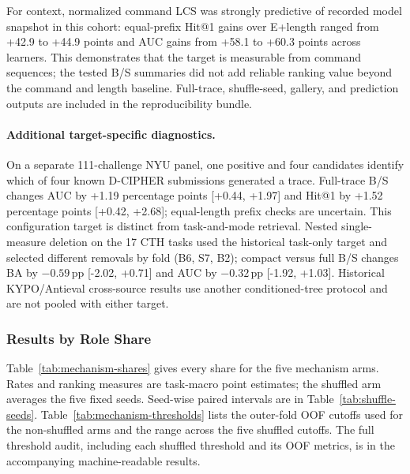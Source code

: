\documentclass[10pt]{article}
\newcommand{\pp}{\ensuremath{\,\mathrm{pp}}}
\begin{document}
For context, normalized command LCS was strongly predictive of recorded model snapshot in this cohort: equal-prefix Hit@1 gains over E+length ranged from +42.9 to +44.9 points and AUC gains from +58.1 to +60.3 points across learners. This demonstrates that the target is measurable from command sequences; the tested B/S summaries did not add reliable ranking value beyond the command and length baseline. Full-trace, shuffle-seed, gallery, and prediction outputs are included in the reproducibility bundle.

\paragraph{Additional target-specific diagnostics.} On a separate 111-challenge NYU panel, one positive and four candidates identify which of four known D-CIPHER submissions generated a trace. Full-trace B/S changes AUC by +1.19 percentage points [+0.44, +1.97] and Hit@1 by +1.52 percentage points [+0.42, +2.68]; equal-length prefix checks are uncertain. This configuration target is distinct from task-and-mode retrieval. Nested single-measure deletion on the 17 CTH tasks used the historical task-only target and selected different removals by fold (B6, S7, B2); compact versus full B/S changes BA by $-0.59\pp$ [-2.02, +0.71] and AUC by $-0.32\pp$ [-1.92, +1.03]. Historical KYPO/Antieval cross-source results use another conditioned-tree protocol and are not pooled with either target.

\subsubsection{Results by Role Share}
Table~\ref{tab:mechanism-shares} gives every share for the five mechanism arms. Rates and ranking measures are task-macro point estimates; the shuffled arm averages the five fixed seeds. Seed-wise paired intervals are in Table~\ref{tab:shuffle-seeds}. Table~\ref{tab:mechanism-thresholds} lists the outer-fold OOF cutoffs used for the non-shuffled arms and the range across the five shuffled cutoffs. The full threshold audit, including each shuffled threshold and its OOF metrics, is in the accompanying machine-readable results.
\end{document}
